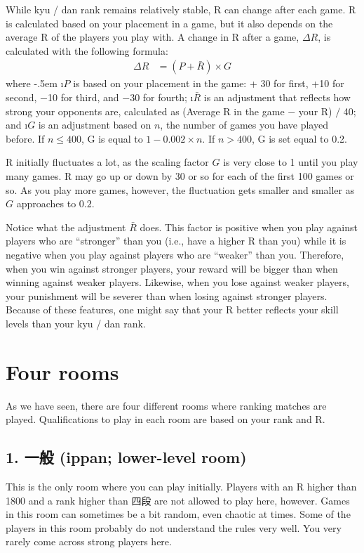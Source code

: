 \bigskip
While {\jap kyu / dan} rank remains relatively stable, R can change after each game. R is calculated based on your placement in a game, but it also depends on the average R of the players you play with. 
A change in R after a game, $\Delta R$, is calculated with the following formula:
\begin{align*}
\Delta R &= (P + \bar{R}) \times G
\end{align*}
where 
\bi \itemsep-.5em
\i $P$ is based on your placement in the game: + 30 for first, +10 for second, $-$10 for third, and $-$30 for fourth;
\i $\bar{R}$ is an adjustment that reflects how strong your opponents are, calculated as (Average R in the game $-$ your R) $/$ 40; and
\i $G$ is an adjustment based on $n$, the number of games you have played before. If $n \leq 400$, G is equal to $1-0.002 \times n$. If $n > 400$, G is set equal to 0.2.
\ei

R initially fluctuates a lot, as the scaling factor $G$ is very close to 1 until you play many games. R may go up or down by 30 or so for each of the first 100 games or so. As you play more games, however, the fluctuation gets smaller and smaller as $G$ approaches to $0.2$. 

\bigskip
Notice what the adjustment $\bar{R}$ does. This factor is positive when you play against players who are ``stronger'' than you (i.e., have a higher R than you) while it is negative when you play against players who are ``weaker'' than you. Therefore, when you win against stronger players, your reward will be bigger than when winning against weaker players. Likewise, when you lose against weaker players, your punishment will be severer than when losing against stronger players. 
Because of these features, one might say that your R better reflects your skill levels than your {\jap kyu / dan} rank. 

\newpage

\section{Four rooms}
As we have seen, there are four different rooms where ranking match\-es are played. Qualifications to play in each room are based on your rank and R. 

\bigskip
\subsection*{1. 一般 ({\jap ippan}; lower-level room)}
This is the only room where you can play initially. Players with an R higher than 1800 and a rank higher than 四段 are not allowed to play here, however. Games in this room can sometimes be a bit random, even chaotic at times. Some of the players in this room probably do not understand the rules very well. You very rarely come across strong players here. 


